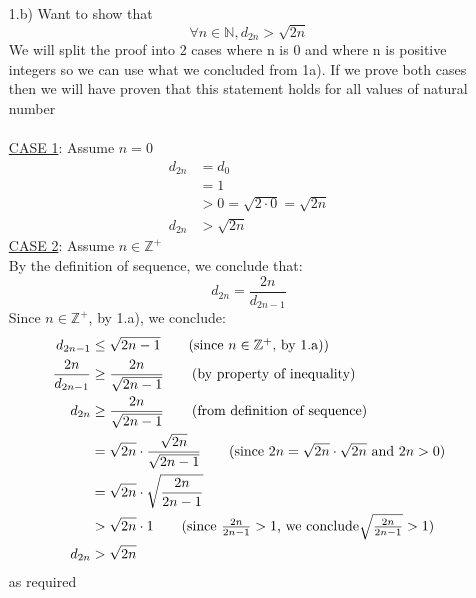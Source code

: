 \documentclass[20pt]{article}
\begin{document}
\newpage
\begin{enumerate}
    \item[1.b)] Want to show that
    \[\forall n \in \mathbb{N}, d_{2n} > \sqrt{2n}\]
    We will split the proof into 2 cases where n is 0 and where n is positive integers so we can use what we concluded from 1a). If we prove both cases then we will have proven that this statement holds for all values of natural number\\\\
    \underline{CASE 1}: Assume $n = 0$
    \begin{align*}
        d_{2n} &= d_{0}
        \tag{since n = 0}\\
        &= 1 
        \tag{from definition of the sequence}\\
        &> 0
        = \sqrt{2\cdot0}
        = \sqrt{2n}\\
        d_{2n} &> \sqrt{2n}
    \end{align*}
    \underline{CASE 2}: Assume $n \in \mathbb{Z^+}$\\
    By the definition of sequence, we conclude that:
    \[
        d_{2n} = \frac{2n}{d_{2n-1}}
    \]
    Since $n \in\mathbb{Z^+}$, by 1.a), we conclude:
    \begin{align*}
        d_{2n-1} &\leq \sqrt{2n - 1}
        \tag{since $n\in\mathbb{Z^+},$ by 1.a)}\\
        \frac{2n}{d_{2n-1}} &\geq \frac{2n}{\sqrt{2n-1}}
        \tag{by property of inequality}\\
        d_{2n} &\geq \frac{2n}{\sqrt{2n-1}}\tag{from definition of sequence}\\
        &= \sqrt{2n} \cdot \frac{\sqrt{2n}}{\sqrt{2n-1}}
        \tag{since $2n = \sqrt{2n} \cdot \sqrt{2n}$ and $2n > 0$}\\
        &= \sqrt{2n} \cdot \sqrt{\frac{2n}{2n-1}}\\
        &> \sqrt{2n} \cdot 1 \tag{since $\frac{2n}{2n-1}>1$, we conclude$ \sqrt{\frac{2n}{2n-1}}>1$}\\
        d_{2n} &> \sqrt{2n}
    \end{align*}
    as required \hfill \Box
    
\end{enumerate}


\newpage
\end{document}
